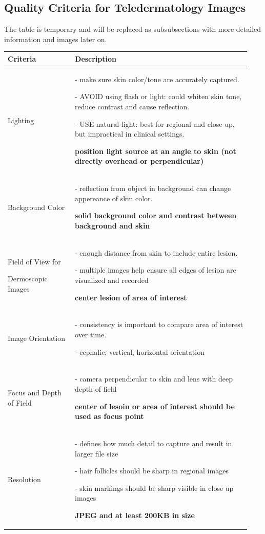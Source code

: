 \subsection{Quality Criteria for Teledermatology Images}
\label{sub:QualityCriteriaTeledermatology}
The table is temporary and will be replaced as subsubsections with more detailed information and images later on. \par
\begin{tabular}{|p{0.26\linewidth}|p{0.68\linewidth}|}
\hline
\textbf{Criteria} & \textbf{Description} \\
\hline
Lighting & - make sure skin color/tone are accurately captured.\par - AVOID using flash or light: could whiten skin tone, reduce contrast and cause reflection.\par - USE natural light: best for regional and close up, but impractical in clinical settings.\par \textbf{position light source at an angle to skin (not directly overhead or perpendicular)}\\
\hline
Background Color & - reflection from object in background can change appereance of skin color. \par \textbf{solid background color and contrast between background and skin} \\
\hline
Field of View for \par Dermoscopic Images & - enough distance from skin to include entire lesion. \par - multiple images help ensure all edges of lesion are visualized and recorded \par \textbf{center lesion of area of interest} \\
\hline
Image Orientation & - consistency is important to compare area of interest over time. \par - cephalic, vertical, horizontal orientation \\
\hline
Focus and Depth of Field & - camera perpendicular to skin and lens with deep depth of field \par \textbf{center of lesoin or area of interest should be used as focus point} \\
\hline
Resolution & - defines how much detail to capture and result in larger file size \par - hair follicles should be sharp in regional images \par - skin markings should be sharp visible in close up images \par \textbf{JPEG and at least 200KB in size} \\

\end{tabular}
